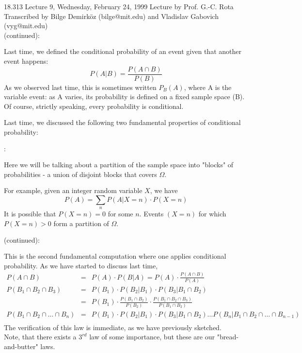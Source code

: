 {\Large 18.313 Lecture 9, Wednesday, February 24, 1999}\newline
{\large Lecture by Prof. G.-C. Rota}\\
Transcribed by Bilge Demirk\"oz (bilge@mit.edu) and Vladislav Gabovich (vyg@mit.edu)\\

 (continued):

Last time, we defined the conditional probability of an event given
that another event happens:
\begin{equation}
P(A|B)= \frac {P(A \cap B)} {P(B)}
\end{equation}
As we observed last time, this is sometimes written $P_{B}(A)$, 
where A is the variable event: as A varies, its probability is
defined on a fixed sample space (B).
Of course, strictly speaking, every probability is conditional.

Last time, we discussed the following two fundamental properties
of conditional probability:

:

Here we will be talking about a partition of the sample space
into "blocks" of probabilities - a union of disjoint blocks
that covers $\Omega$.

For example, given an integer random variable $X$, we have
\begin{equation}
P(A)= \sum_{n} P(A|X=n)\cdot P(X=n)
\end{equation}
It is possible that $P(X=n)=0$ for some $n$. Events $(X=n)$ for which
$P(X=n)>0$ form a partition of $\Omega$.

 (continued):

This is the second fundamental computation where one applies 
conditional probability. As we have started to discuss last time,
\begin{eqnarray*}
P(A \cap B) &=& P(A)\cdot P(B|A) = P(A) \cdot \frac{P(A \cap B)}{P(A)}\\ 
P(B_1\cap B_2 \cap B_3) &=& P(B_1) \cdot P(B_2|B_1) \cdot P(B_3|B_1 \cap B_2)\\ 
&=& P(B_1) \cdot \frac{P(B_1 \cap B_2)}{P(B_2)} \cdot \frac{P(B_1 \cap B_2 \cap
B_3)}{P(B_1 \cap B_2)}\\ 
P(B_1 \cap B_2 \cap \ldots \cap B_n) &=& P(B_1) \cdot P(B_2|B_1) \cdot
P(B_3|B_1 \cap B_2) \ldots P(B_n | B_1 \cap B_2 \cap \ldots \cap B_{n-1})\\
\end{eqnarray*}
The verification of this law is immediate, as we have previously
sketched.\\
Note, that there exists a $3^{rd}$ law of some importance, but these are 
our "bread-and-butter" laws.

